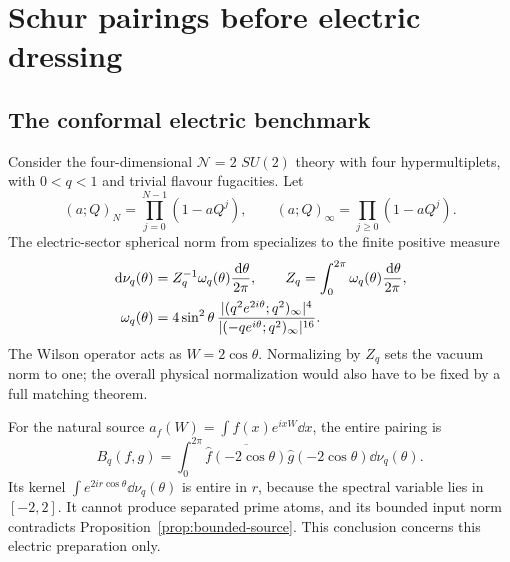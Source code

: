 \section{Schur pairings before electric dressing}\label{sec:schur}
\subsection{The conformal electric benchmark}
Consider the four-dimensional $\mathcal N=2$ $SU(2)$ theory with four
hypermultiplets, with $0<q<1$ and trivial flavour fugacities. Let
\begin{equation}\label{eq:pochhammer}
 (a;Q)_N=\prod_{j=0}^{N-1}(1-aQ^j),\qquad
 (a;Q)_\infty=\prod_{j\geq0}(1-aQ^j).
\end{equation}
The electric-sector spherical norm from \cite[Section 5.1.5]{Schur}
specializes to the finite positive measure
\begin{align}
 \,\mathrm d\nu_q(\theta)&=Z_q^{-1}\omega_q(\theta)\frac{\,\mathrm d\theta}{2\pi},
 \qquad Z_q=\int_0^{2\pi}\omega_q(\theta)\frac{\,\mathrm d\theta}{2\pi},
 \notag\\
 \omega_q(\theta)&=4\sin^2\theta\,
 \frac{|(q^2e^{2i\theta};q^2)_\infty|^4}
      {|(-qe^{i\theta};q^2)_\infty|^{16}}.
 \label{eq:su2-measure}
\end{align}
The Wilson operator acts as $W=2\cos\theta$. Normalizing by $Z_q$
sets the vacuum norm to one; the overall physical normalization would
also have to be fixed by a full matching theorem.

For the natural source $a_f(W)=\int f(x)e^{ixW}\dd x$, the entire
pairing is
\begin{equation}\label{eq:wilson-norm}
 B_q(f,g)=\int_0^{2\pi}
 \overline{\widehat f(-2\cos\theta)}\widehat g(-2\cos\theta)
 \dd\nu_q(\theta).
\end{equation}
Its kernel $\int e^{2ir\cos\theta}\dd\nu_q(\theta)$ is entire in
$r$, because the spectral variable lies in $[-2,2]$. It cannot produce
separated prime atoms, and its bounded input norm contradicts
Proposition~\ref{prop:bounded-source}. This conclusion concerns this
electric preparation only.

